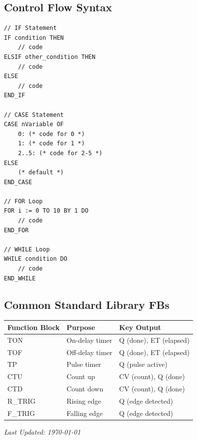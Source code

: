 \documentclass[11pt,a4paper]{article}
\begin{document}
\subsection*{Control Flow Syntax}

\begin{lstlisting}
// IF Statement
IF condition THEN
    // code
ELSIF other_condition THEN
    // code
ELSE
    // code
END_IF

// CASE Statement
CASE nVariable OF
    0: (* code for 0 *)
    1: (* code for 1 *)
    2..5: (* code for 2-5 *)
ELSE
    (* default *)
END_CASE

// FOR Loop
FOR i := 0 TO 10 BY 1 DO
    // code
END_FOR

// WHILE Loop
WHILE condition DO
    // code
END_WHILE
\end{lstlisting}

\subsection*{Common Standard Library FBs}

\begin{table}[h]
\centering
\begin{tabular}{@{}lll@{}}
\toprule
\textbf{Function Block} & \textbf{Purpose} & \textbf{Key Output} \\
\midrule
TON & On-delay timer & Q (done), ET (elapsed) \\
TOF & Off-delay timer & Q (done), ET (elapsed) \\
TP & Pulse timer & Q (pulse active) \\
CTU & Count up & CV (count), Q (done) \\
CTD & Count down & CV (count), Q (done) \\
R\_TRIG & Rising edge & Q (edge detected) \\
F\_TRIG & Falling edge & Q (edge detected) \\
\bottomrule
\end{tabular}
\end{table}

\vfill

\begin{center}
\textit{Last Updated: \today}
\end{center}
\end{document}
